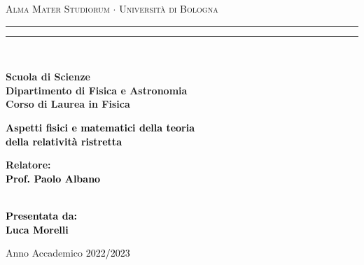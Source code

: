 \begin{titlepage}
\begin{center}
	{{\Large{\textsc{Alma Mater Studiorum $\cdot$ Universit\`a di Bologna}}}} 
	\rule[0.1cm]{15.8cm}{0.1mm}
	\rule[0.5cm]{15.8cm}{0.6mm}
	\\\vspace{3mm}
	
	{\small{\bf Scuola di Scienze \\ 
			Dipartimento di Fisica e Astronomia\\
			Corso di Laurea in Fisica}}
	
\end{center}

\vspace{50mm}

\begin{center}\textcolor{black}{
		{\LARGE{\bf Aspetti fisici e matematici della teoria\\\vspace{5mm} della relatività ristretta}}\\
}\end{center}

\vspace{50mm} \par \noindent

\begin{minipage}[t]{0.47\textwidth}
	\large{\bf Relatore: \vspace{2mm}\\\textcolor{black}{
				Prof. Paolo Albano}}\\\\
\end{minipage}
%
\hfill
%
\begin{minipage}[t]{0.47\textwidth}\raggedleft \textcolor{black}{
		{\large{\bf Presentata da:
				\vspace{2mm}\\
				Luca Morelli  }}}
\end{minipage}

\vspace{40mm}

\begin{center}
	Anno Accademico \textcolor{black}{ 2022/2023}
\end{center}


\end{titlepage}